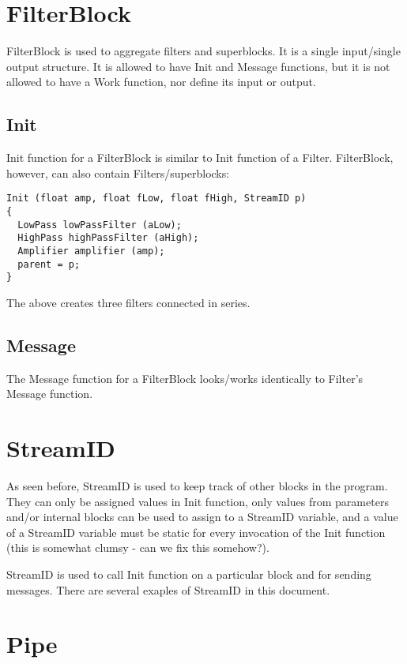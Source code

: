 \documentclass[twocolumn, draft]{article}
\begin{document}
\section{FilterBlock}

FilterBlock is used to aggregate filters and superblocks.  It is a 
single input/single output structure.  It is allowed to have Init and Message
functions, but it is not allowed to have a Work function, nor define its
input or output.

\subsection{Init}

Init function for a FilterBlock is similar to Init function of a Filter.
FilterBlock, however, can also contain Filters/superblocks:

\begin{verbatim}
Init (float amp, float fLow, float fHigh, StreamID p)
{
  LowPass lowPassFilter (aLow);
  HighPass highPassFilter (aHigh);
  Amplifier amplifier (amp);
  parent = p;
}
\end{verbatim}

The above creates three filters connected in series.

\subsection{Message}

The Message function for a FilterBlock looks/works
identically to Filter's Message function.

\section{StreamID}

As seen before, StreamID is used to keep track of other blocks in the 
program.  They can only be assigned values in Init function, only 
values from parameters and/or internal blocks can be used to assign
to a StreamID variable, and a value of a StreamID variable must be
static for every invocation of the Init function (this is somewhat
clumsy - can we fix this somehow?).

StreamID is used to call Init function on a particular block and for
sending messages.  There are several exaples of StreamID in this document.

\section{Pipe}
\end{document}
